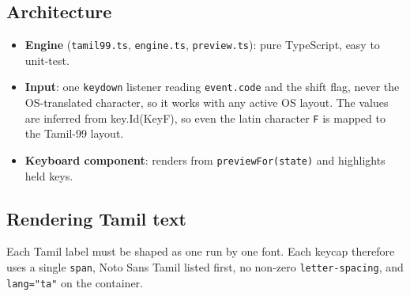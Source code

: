 \documentclass[11pt,a4paper]{article}
\begin{document}
\subsection{Architecture}
\begin{itemize}
  \item \textbf{Engine} (\texttt{tamil99.ts}, \texttt{engine.ts},
        \texttt{preview.ts}): pure TypeScript, easy to unit-test.
  \item \textbf{Input}: one \texttt{keydown} listener reading
        \texttt{event.code} and the shift flag, never the OS-translated
        character, so it works with any active OS layout.
        The values are inferred from key.Id(KeyF), so even the latin character \texttt{F} is mapped to the Tamil-99 layout.
  \item \textbf{Keyboard component}: renders from \texttt{previewFor(state)} and
        highlights held keys.
\end{itemize}

\subsection{Rendering Tamil text}
Each Tamil label must be shaped as one run by one font. Each keycap therefore
uses a single \texttt{span}, Noto Sans Tamil listed first, no non-zero
\texttt{letter-spacing}, and \texttt{lang="ta"} on the container.

\end{document}
